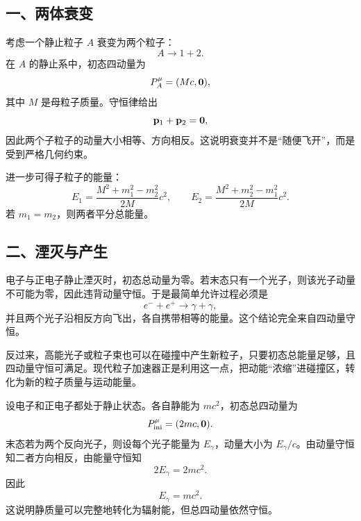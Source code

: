 \subsection*{一、两体衰变}

考虑一个静止粒子 $A$ 衰变为两个粒子：
\[
A\to 1+2.
\]
在 $A$ 的静止系中，初态四动量为
\[
P_A^\mu=(M c,\vb{0}),
\]
其中 $M$ 是母粒子质量。守恒律给出
\[
\vb{p}_1+\vb{p}_2=\vb{0},
\]
因此两个子粒子的动量大小相等、方向相反。这说明衰变并不是“随便飞开”，而是受到严格几何约束。

\begin{center}
\end{center}

进一步可得子粒子的能量：
\[
E_1 = \frac{M^2+m_1^2-m_2^2}{2M}c^2,
\qquad
E_2 = \frac{M^2+m_2^2-m_1^2}{2M}c^2.
\]
若 $m_1=m_2$，则两者平分总能量。

\subsection*{二、湮灭与产生}

电子与正电子静止湮灭时，初态总动量为零。若末态只有一个光子，则该光子动量不可能为零，因此违背动量守恒。于是最简单允许过程必须是
\[
e^-+e^+\to \gamma+\gamma,
\]
并且两个光子沿相反方向飞出，各自携带相等的能量。这个结论完全来自四动量守恒。

反过来，高能光子或粒子束也可以在碰撞中产生新粒子，只要初态总能量足够，且四动量守恒可满足。现代粒子加速器正是利用这一点，把动能“浓缩”进碰撞区，转化为新的粒子质量与运动能量。

\begin{example}
设电子和正电子都处于静止状态。各自静能为 $mc^2$，初态总四动量为
\[
P_{\text{ini}}^\mu = (2mc,\vb{0}).
\]
末态若为两个反向光子，则设每个光子能量为 $E_\gamma$，动量大小为 $E_\gamma/c$。由动量守恒知二者方向相反，由能量守恒知
\[
2E_\gamma = 2mc^2.
\]
因此
\[
E_\gamma = mc^2.
\]
这说明静质量可以完整地转化为辐射能，但总四动量依然守恒。
\end{example}

